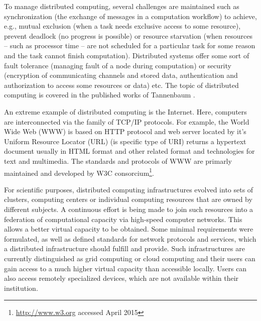 To manage distributed computing, several challenges are maintained such as synchronization (the exchange of messages in a computation workflow) to achieve, e.g., mutual exclusion (when a task needs exclusive access to some resource), prevent deadlock (no progress is possible) or resource starvation (when resources -- such as processor time -- are not scheduled for a particular task for some reason and the task cannot finish computation). Distributed systems offer some sort of fault tolerance (managing fault of a node during computation) or security (encryption of communicating channels and stored data, authentication and authorization to access some resources or data) etc. The topic of distributed computing is covered in the published works of Tannenbaum \cite{Tanenbaum2007}. 

An extreme example of distributed computing is the Internet. Here, computers are interconnected via the family of TCP/IP protocols. For example, the World Wide Web (WWW) is based on HTTP protocol and web server located by it's Uniform Resource Locator (URL) (is specific type of URI)  returns a hypertext document usually in HTML format and other related format and technologies for text and multimedia. The standards and protocols of WWW are primarly maintained and developed by W3C consorcium\footnote{\url{http://www.w3.org} accessed April 2015}. %

For scientific purposes, distributed computing infrastructures evolved into sets of clusters, computing centers or individual computing resources that are owned by different subjects. A continuous effort is being made to join such resources into a federation of computational capacity via high-speed computer networks. This allows a better virtual capacity to be obtained. Some minimal requirements were formulated, as well as defined standards for network protocols and services, which a distributed infrastructure should fulfill and provide. Such infrastructures are currently distinguished as grid computing or cloud computing and their users can gain access to a much higher virtual capacity than accessible locally. Users can also access remotely specialized devices, which are not available within their institution.

